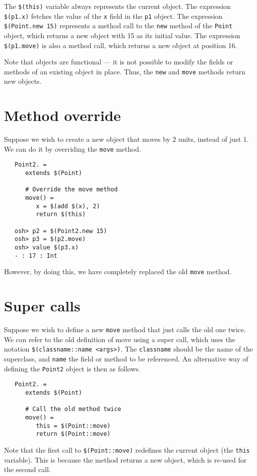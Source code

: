 The \verb+$(this)+ variable always represents the current object.
The expression \verb+$(p1.x)+ fetches the value of the \verb+x+ field
in the \verb+p1+ object.  The expression \verb+$(Point.new 15)+
represents a method call to the \verb+new+ method of the \verb+Point+
object, which returns a new object with 15 as its initial value.  The
expression \verb+$(p1.move)+ is also a method call, which returns a
new object at position 16.

Note that objects are functional --- it is not possible to modify the fields
or methods of an existing object in place.  Thus, the \verb+new+ and \verb+move+
methods return new objects.

\section{Method override}

Suppose we wish to create a new object that moves by 2 units, instead of
just 1.  We can do it by overriding the \verb+move+ method.

\begin{verbatim}
   Point2. =
      extends $(Point)

      # Override the move method
      move() =
         x = $(add $(x), 2)
         return $(this)

   osh> p2 = $(Point2.new 15)
   osh> p3 = $(p2.move)
   osh> value $(p3.x)
   - : 17 : Int
\end{verbatim}

However, by doing this, we have completely replaced the old \verb+move+ method.

\section{Super calls}

Suppose we wish to define a new \verb+move+ method that just calls the old one twice.
We can refer to the old definition of move using a super call, which uses the notation
\verb+$(classname::name <args>)+.  The \verb+classname+ should be the name of the
superclass, and \verb+name+ the field or method to be referenced.  An alternative
way of defining the \verb+Point2+ object is then as follows.

\begin{verbatim}
   Point2. =
      extends $(Point)

      # Call the old method twice
      move() =
         this = $(Point::move)
         return $(Point::move)
\end{verbatim}

Note that the first call to \verb+$(Point::move)+ redefines the
current object (the \verb+this+ variable).  This is because the method
returns a new object, which is re-used for the second call.


